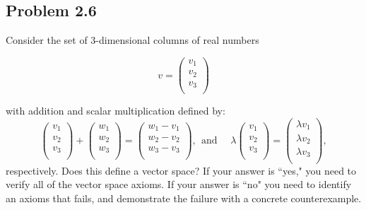 \subsection*{Problem 2.6}
Consider the set of 3-dimensional columns of real numbers

$$ v =  \left( \begin{array}{c}
v_1 \\
v_2 \\
v_3 \\

 \end{array} \right)$$

 with addition and scalar multiplication defined by:
\[
 \left( \begin{array}{c}
v_1 \\
v_2 \\
v_3 \\

 \end{array} \right)  +  \left( \begin{array}{c}
w_1 \\
w_2 \\
w_3 \\

 \end{array}  \right)= \left( \begin{array}{c}
w_1 - v_1 \\
w_2 - v_2\\
w_3 - v_3\\

\end{array} \right), \ \ \mathrm{and}  \ \ \ \ \ \ \lambda \left( \begin{array}{c}
v_1 \\
v_2 \\
v_3 \\ 

 \end{array} \right) = \left( \begin{array}{c}
\lambda v_1 \\
\lambda v_2 \\
\lambda v_3 \\

 \end{array} \right),
\]
respectively. Does this define a vector space? If your answer is ``yes," you need to verify all of the vector space axioms. If your answer is ``no" you need to identify an axioms that fails, and demonstrate the failure with a concrete counterexample. 	
\renewcommand\qedsymbol{}
